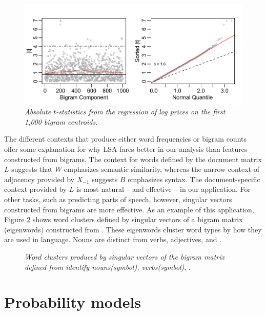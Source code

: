 \documentclass[12pt]{article}
\begin{document}
 
\begin{figure}
\caption{  \label{fig:bigramtstats}  
  {\sl Absolute $t$-statistics from the regression of log prices on the first 1,000 bigram centroids.}  }
  \centerline{ \includegraphics[width=5in]{figures/bigram_tstats.pdf} }
\end{figure}


The different contexts that produce either word frequencies or bigram counts offer some explanation for why LSA fares better in our analysis than features constructed from bigrams.  The context for words defined by the document matrix $L$ suggests that $W$ emphasizes semantic similarity, whereas the narrow context of adjacency provided by $X_{-1}$ suggests $B$ emphasizes syntax.   The document-specific context provided by $L$ is most natural -- and effective -- in our application.  For other tasks, such as predicting parts of speech, however, singular vectors constructed from bigrams are more effective.  As an example of this application, Figure \ref{fig:pos} shows word clusters defined by singular vectors of a bigram matrix  (eigenwords) constructed from  .  These eigenwords cluster word types by how they are used in language.  Nouns are distinct from verbs, adjectives, and .  


\begin{figure}
\caption{  \label{fig:pos}  
  {\sl Word clusters produced by singular vectors of the bigram matrix defined from  identify nouns(symbol), verbs(symbol)}, . }
\end{figure}


\section{Probability models}
\label{sec:topic}
\end{document}
